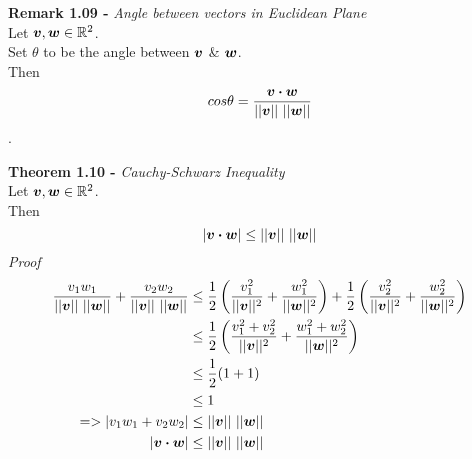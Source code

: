 \documentclass[11pt,a4paper]{article}
\begin{document}
\textbf{Remark 1.09 - }\textit{Angle between vectors in Euclidean Plane} \\
Let $\boldsymbol{v}, \boldsymbol{w} \in \mathbb{R}^2$. \\
Set $\theta$ to be the angle between $\boldsymbol{v}$ \& $\boldsymbol{w}$. \\
Then $$cos\theta = \frac{\boldsymbol{v} \boldsymbol{\cdot} \boldsymbol{w}}{||\boldsymbol{v}||\ ||\boldsymbol{w}||}$$.

\textbf{Theorem 1.10 - }\textit{Cauchy-Schwarz Inequality} \\
Let $\boldsymbol{v}, \boldsymbol{w} \in \mathbb{R}^2$. \\
Then $$|\boldsymbol{v} \boldsymbol{\cdot} \boldsymbol{w}| \leq ||\boldsymbol{v}||\ ||\boldsymbol{w}||$$
%
\textit{Proof}
\begin{align*}
  \frac{v_1w_1}{||\boldsymbol{v}||\ ||\boldsymbol{w}||} + \frac{v_2w_2}{||\boldsymbol{v}||\ ||\boldsymbol{w}||} &\leq \frac{1}{2}\left(\frac{v_{1}^{2}}{||\boldsymbol{v}||^2} + \frac{w_{1}^{2}}{||\boldsymbol{w}||^2}\right) + \frac{1}{2}\left(\frac{v_{2}^{2}}{||\boldsymbol{v}||^2} + \frac{w_{2}^{2}}{||\boldsymbol{w}||^2}\right) \\
  &\leq \frac{1}{2}\left(\frac{v_{1}^{2} + v_{2}^{2}}{||\boldsymbol{v}||^2} + \frac{w_{1}^{2} + w_{2}^{2}}{||\boldsymbol{w}||^2}\right) \\
  &\leq \frac{1}{2}(1 + 1) \\
  &\leq 1 \\
  => |v_1w_1 + v_2w_2| &\leq ||\boldsymbol{v}||\ ||\boldsymbol{w}|| \\
  |\boldsymbol{v} \boldsymbol{\cdot} \boldsymbol{w}| &\leq ||\boldsymbol{v}||\ ||\boldsymbol{w}|| \\
\end{align*}
\end{document}
